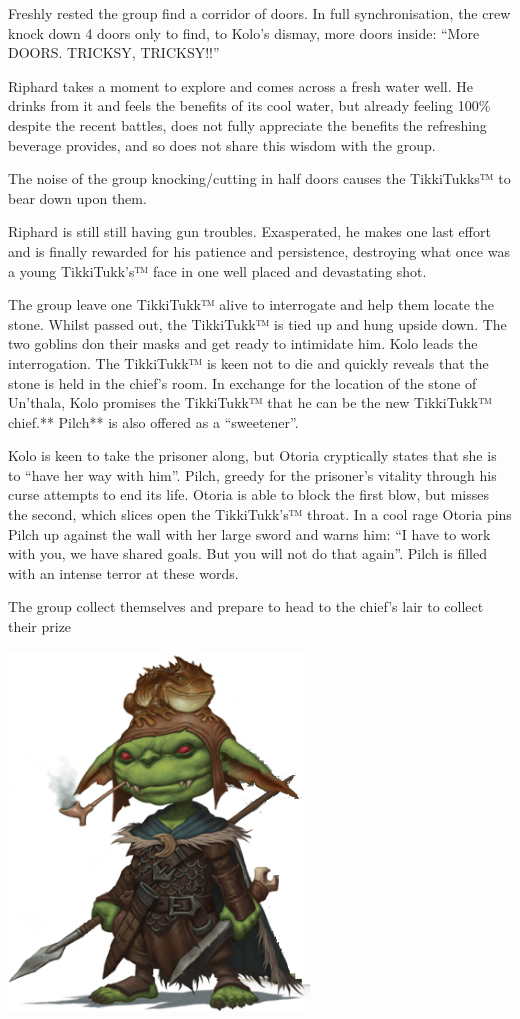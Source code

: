 Freshly rested the group find a corridor of doors. In full synchronisation, the crew knock down 4 doors only to find, to Kolo’s dismay, more doors inside: “More DOORS. TRICKSY, TRICKSY!!”\medskip

Riphard takes a moment to explore and comes across a fresh water well. He drinks from it and feels the benefits of its cool water, but already feeling 100\% despite the recent battles, does not fully appreciate the benefits the refreshing beverage provides, and so does not share this wisdom with the group.\medskip

The noise of the group knocking/cutting in half doors causes the TikkiTukks™ to bear down upon them.\medskip

Riphard is still still having gun troubles. Exasperated, he makes one last effort and is finally rewarded for his patience and persistence, destroying what once was a young TikkiTukk's™ face in one well placed and devastating shot.\medskip

The group leave one TikkiTukk™ alive to interrogate and help them locate the stone. Whilst passed out, the TikkiTukk™ is tied up and hung upside down. The two goblins don their masks and get ready to intimidate him. Kolo leads the interrogation. The TikkiTukk™ is keen not to die and quickly reveals that the stone is held in the chief’s room. In exchange for the location of the stone of Un'thala, Kolo promises the TikkiTukk™ that he can be the new TikkiTukk™ chief.** Pilch** is also offered as a “sweetener”.\medskip

Kolo is keen to take the prisoner along, but Otoria cryptically states that she is to “have her way with him”. Pilch, greedy for the prisoner’s vitality through his curse attempts to end its life. Otoria is able to block the first blow, but misses the second, which slices open the TikkiTukk’s™ throat. In a cool rage Otoria pins Pilch up against the wall with her large sword and warns him: “I have to work with you, we have shared goals. But you will not do that again”. Pilch is filled with an intense terror at these words.\medskip

The group collect themselves and prepare to head to the chief’s lair to collect their prize

\begin{center}
\includegraphics[width=80mm]{./content/img/kolo2.png}
\begin{figure}[h]
\end{figure}
\end{center}

\clearpage

